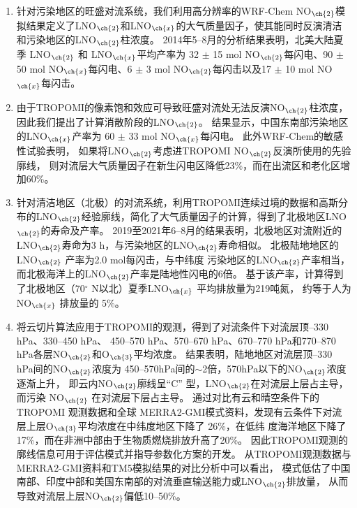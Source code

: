 \begin{enumerate}[label=（\arabic*）, labelindent=\parindent, nosep, leftmargin=0pt, widest=0, itemindent=*, topsep=0pt, partopsep=0pt, parsep=0pt]

\item 针对污染地区的旺盛对流系统，我们利用高分辨率的WRF-Chem NO$_{\ch{2}}$模拟结果定义了LNO$_{\ch{2}}$和LNO$_{\ch{x}}$的大气质量因子，使其能同时反演清洁和污染地区的LNO$_{\ch{2}}$柱浓度。
2014年5--8月的分析结果表明，北美大陆夏季 LNO$_{\ch{2}}$ 和 LNO$_{\ch{x}}$平均产率为
32 $\pm$ 15 mol NO$_{\ch{2}}$每闪电、90 $\pm$ 50 mol NO$_{\ch{x}}$每闪电、6 $\pm$ 3 mol NO$_{\ch{2}}$每闪击以及17 $\pm$ 10 mol NO$_{\ch{x}}$每闪击。

\item 由于TROPOMI的像素饱和效应可导致旺盛对流处无法反演NO$_{\ch{2}}$柱浓度，因此我们提出了计算消散阶段的LNO$_{\ch{2}}$。
结果显示，中国东南部污染地区的LNO$_{\ch{x}}$产率为 60 $\pm$ 33 mol NO$_{\ch{x}}$每闪电。
此外WRF-Chem的敏感性试验表明，
如果将LNO$_{\ch{2}}$考虑进TROPOMI NO$_{\ch{2}}$反演所使用的先验廓线，
则对流层大气质量因子在新生闪电区降低23\%，而在出流区和老化区增加60\%。

\item 针对清洁地区（北极）的对流系统，利用TROPOMI连续过境的数据和高斯分布的LNO$_{\ch{2}}$经验廓线，简化了大气质量因子的计算，得到了北极地区LNO$_{\ch{2}}$的寿命及产率。
2019至2021年6--8月的结果表明，北极地区对流附近的LNO$_{\ch{2}}$寿命为3 h，与污染地区的LNO$_{\ch{2}}$寿命相似。
北极陆地地区的LNO$_{\ch{2}}$ 产率为2.0 mol每闪击，与中纬度
污染地区的LNO$_{\ch{2}}$产率相当，而北极海洋上的LNO$_{\ch{2}}$产率是陆地性闪电的6倍。
基于该产率，计算得到了北极地区（70$^{\circ}$ N以北）夏季LNO$_{\ch{x}}$ 平均排放量为219吨氮，
约等于人为 NO$_{\ch{x}}$ 排放量的 5\%。

\item 将云切片算法应用于TROPOMI的观测，得到了对流条件下对流层顶--330 hPa、330--450 hPa、
450--570 hPa、570--670 hPa、670--770 hPa和770--870 hPa各层NO$_{\ch{2}}$和O$_{\ch{3}}$平均浓度。
结果表明，陆地地区对流层顶--330 hPa间的NO$_{\ch{2}}$浓度为 450--570hPa间的$\sim$2倍，570hPa以下的NO$_{\ch{2}}$浓度逐渐上升，
即云内NO$_{\ch{2}}$廓线呈“C” 型，LNO$_{\ch{2}}$在对流层上层占主导，而污染 NO$_{\ch{2}}$ 在对流层下层占主导。
通过对比有云和晴空条件下的 TROPOMI 观测数据和全球
MERRA2-GMI模式资料，发现有云条件下对流层上层O$_{\ch{3}}$平均浓度在中纬度地区下降了 26\%，在低纬
度海洋地区下降了 17\%，而在非洲中部由于生物质燃烧排放升高了20\%。
因此TROPOMI观测的廓线信息可用于评估模式并指导参数化方案的开发。
从TROPOMI观测数据与MERRA2-GMI资料和TM5模拟结果的对比分析中可以看出，
模式低估了中国南部、印度中部和美国东南部的对流垂直输送能力或LNO$_{\ch{2}}$排放量，
从而导致对流层上层NO$_{\ch{2}}$偏低10--50\%。


\end{enumerate}
